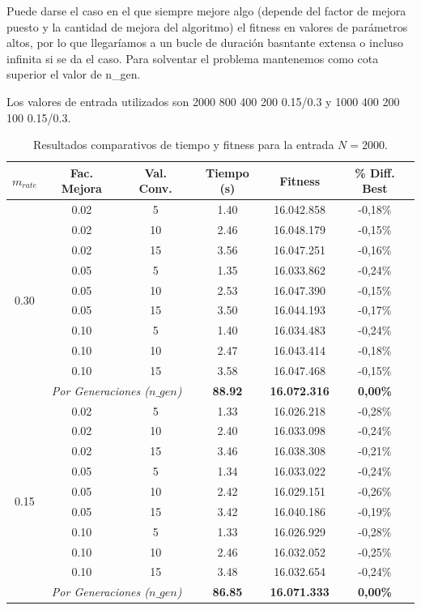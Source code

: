 \documentclass[12pt]{article}
\begin{document}
\begin{enumerate}
Puede darse el caso en el que siempre mejore algo (depende del factor de mejora puesto y la cantidad de mejora del algoritmo) el fitness en valores de parámetros altos, por lo 
que llegaríamos a un bucle de duración basntante extensa o incluso infinita si se da el caso. Para solventar el problema mantenemos como cota superior el valor de n\_gen.

Los valores de entrada utilizados son 2000 800 400 200 0.15/0.3 y 1000 400 200 100 0.15/0.3.

\begin{table}[htbp]
\centering
\caption{Resultados comparativos de tiempo y fitness para la entrada $N = 2000$.}
\label{tab:resultados_2000}
\begin{tabular}{cccccc}
\toprule
\textbf{$m_{rate}$} & \textbf{Fac. Mejora} & \textbf{Val. Conv.} & \textbf{Tiempo (s)} & \textbf{Fitness} & \textbf{\% Diff. Best} \\ 
\midrule
\multirow{10}{*}{0.30} 
 & 0.02 & 5  & 1.40 & 16.042.858 & -0,18\% \\
 & 0.02 & 10 & 2.46 & 16.048.179 & -0,15\% \\
 & 0.02 & 15 & 3.56 & 16.047.251 & -0,16\% \\
 \cmidrule(lr){2-6}
 & 0.05 & 5  & 1.35 & 16.033.862 & -0,24\% \\
 & 0.05 & 10 & 2.53 & 16.047.390 & -0,15\% \\
 & 0.05 & 15 & 3.50 & 16.044.193 & -0,17\% \\
 \cmidrule(lr){2-6}
 & 0.10 & 5  & 1.40 & 16.034.483 & -0,24\% \\
 & 0.10 & 10 & 2.47 & 16.043.414 & -0,18\% \\
 & 0.10 & 15 & 3.58 & 16.047.468 & -0,15\% \\
 \cmidrule(lr){2-6}
 & \multicolumn{2}{c}{\textit{Por Generaciones ($n\_gen$)}} & \textbf{88.92} & \textbf{16.072.316} & \textbf{0,00\%} \\
\midrule
\multirow{10}{*}{0.15} 
 & 0.02 & 5  & 1.33 & 16.026.218 & -0,28\% \\
 & 0.02 & 10 & 2.40 & 16.033.098 & -0,24\% \\
 & 0.02 & 15 & 3.46 & 16.038.308 & -0,21\% \\
 \cmidrule(lr){2-6}
 & 0.05 & 5  & 1.34 & 16.033.022 & -0,24\% \\
 & 0.05 & 10 & 2.42 & 16.029.151 & -0,26\% \\
 & 0.05 & 15 & 3.42 & 16.040.186 & -0,19\% \\
 \cmidrule(lr){2-6}
 & 0.10 & 5  & 1.33 & 16.026.929 & -0,28\% \\
 & 0.10 & 10 & 2.46 & 16.032.052 & -0,25\% \\
 & 0.10 & 15 & 3.48 & 16.032.654 & -0,24\% \\
 \cmidrule(lr){2-6}
 & \multicolumn{2}{c}{\textit{Por Generaciones ($n\_gen$)}} & \textbf{86.85} & \textbf{16.071.333} & \textbf{0,00\%} \\
\bottomrule
\end{tabular}
\end{table}



\end{enumerate}
\end{document}
